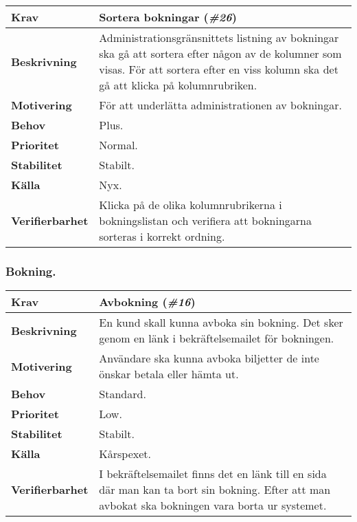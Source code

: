 \documentclass[a4paper, twoside, 11pt, titlepage]{article}
\begin{document}
		\begin{tabular} { p{2.6cm} p{12.5cm} }
			\hline
			\sffamily\textbf{Krav} & Sortera bokningar (\emph{\#26})  \\
			\hline
			\sffamily\textbf{Beskrivning} & Administrationsgränsnittets listning av bokningar ska gå att sortera efter någon av de kolumner som visas. För att sortera efter en viss kolumn ska det gå att klicka på kolumnrubriken.  \\
			\hline
			\sffamily\textbf{Motivering} & För att underlätta administrationen av bokningar.  \\
			\hline
			\sffamily\textbf{Behov} & Plus.  \\
			\hline
			\sffamily\textbf{Prioritet} & Normal.  \\
			\hline
			\sffamily\textbf{Stabilitet} & Stabilt.  \\
			\hline
			\sffamily\textbf{Källa} & Nyx.  \\
			\hline
			\sffamily\textbf{Verifierbarhet} & Klicka på de olika kolumnrubrikerna i bokningslistan och verifiera att bokningarna sorteras i korrekt ordning.  \\
			\hline
		\end{tabular}


		\subsubsection{Bokning.}


		\begin{tabular} { p{2.6cm} p{12.5cm} }
			\hline
			\sffamily\textbf{Krav} & Avbokning (\emph{\#16})  \\
			\hline
			\sffamily\textbf{Beskrivning} & En kund skall kunna avboka sin bokning. Det sker genom en länk i bekräftelsemailet för bokningen.  \\
			\hline
			\sffamily\textbf{Motivering} & Användare ska kunna avboka biljetter de inte önskar betala eller hämta ut.  \\
			\hline
			\sffamily\textbf{Behov} & Standard.  \\
			\hline
			\sffamily\textbf{Prioritet} & Low.  \\
			\hline
			\sffamily\textbf{Stabilitet} & Stabilt.  \\
			\hline
			\sffamily\textbf{Källa} & Kårspexet.  \\
			\hline
			\sffamily\textbf{Verifierbarhet} & I bekräftelsemailet finns det en länk till en sida där man kan ta bort sin bokning. Efter att man avbokat ska bokningen vara borta ur systemet.  \\
			\hline
		\end{tabular}
		\vspace{6mm}
\end{document}
